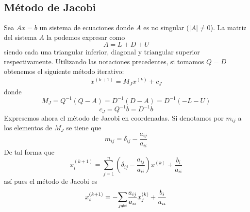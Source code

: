    \subsection{Método de Jacobi}
    \begin{met} Sea $Ax=b$ un sistema de ecuaciones donde $A$ es no singular ($|A| \neq 0$). La matriz del sistema $A$ la podemos expresar como
    $$A=L+D+U$$
siendo cada una triangular inferior, diagonal y triangular superior respectivamente. Utilizando las notaciones precedentes, si tomamos $Q=D$ obtenemos el siguiente método iterativo:
\begin{align}
x^{(k+1)}=M_J x^{(k)}+c_J    
\label{met:jac}
\end{align}
donde
$$M_J=Q^{-1}(Q-A)=D^{-1}(D-A)=D^{-1}(-L-U)$$
$$c_J=Q^{-1}b=D^{-1}b$$
Expresemos ahora el método de Jacobi en coordenadas. Si denotamos por $m_{ij}$ a los elementos de $M_J$ se tiene que
$$m_{ij}=\delta_{ij}-\dfrac{a_{ij}}{a_{ii}}$$
De tal forma que 
$$x_i^{(k+1)}=\sum_{j=1}^n\left(\delta_{ij}-\dfrac{a_{ij}}{a_{ii}}\right)x^{(k)}+\dfrac{b_i}{a_{ii}}$$
así pues el método de Jacobi es
$$x_i^{(k+1)}=-\mathlarger{\sum}_{j \neq i}\dfrac{a_{ij}}{a_{ii}} x_j^{(k)} + \dfrac{b_i}{a_{ii}}$$
    
    
    \end{met}

